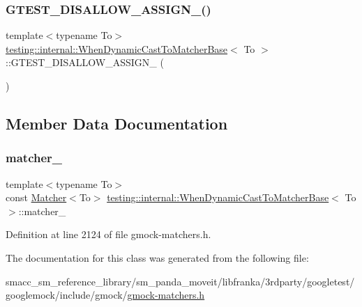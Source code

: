 \subsubsection{\texorpdfstring{G\+T\+E\+S\+T\+\_\+\+D\+I\+S\+A\+L\+L\+O\+W\+\_\+\+A\+S\+S\+I\+G\+N\+\_\+()}{GTEST\_DISALLOW\_ASSIGN\_()}}
{\footnotesize\ttfamily template$<$typename To$>$ \\
\hyperlink{classtesting_1_1internal_1_1WhenDynamicCastToMatcherBase}{testing\+::internal\+::\+When\+Dynamic\+Cast\+To\+Matcher\+Base}$<$ To $>$\+::G\+T\+E\+S\+T\+\_\+\+D\+I\+S\+A\+L\+L\+O\+W\+\_\+\+A\+S\+S\+I\+G\+N\+\_\+ (\begin{DoxyParamCaption}\item[{\hyperlink{classtesting_1_1internal_1_1WhenDynamicCastToMatcherBase}{When\+Dynamic\+Cast\+To\+Matcher\+Base}$<$ To $>$}]{ }\end{DoxyParamCaption})\hspace{0.3cm}{\ttfamily [private]}}



\subsection{Member Data Documentation}
\mbox{\label{classtesting_1_1internal_1_1WhenDynamicCastToMatcherBase_a40d697407c960bee8fe3b125f5ac8730}} 
\subsubsection{\texorpdfstring{matcher\+\_\+}{matcher\_}}
{\footnotesize\ttfamily template$<$typename To$>$ \\
const \hyperlink{classtesting_1_1Matcher}{Matcher}$<$To$>$ \hyperlink{classtesting_1_1internal_1_1WhenDynamicCastToMatcherBase}{testing\+::internal\+::\+When\+Dynamic\+Cast\+To\+Matcher\+Base}$<$ To $>$\+::matcher\+\_\+\hspace{0.3cm}{\ttfamily [protected]}}



Definition at line 2124 of file gmock-\/matchers.\+h.



The documentation for this class was generated from the following file\+:\begin{DoxyCompactItemize}
\item 
smacc\+\_\+sm\+\_\+reference\+\_\+library/sm\+\_\+panda\+\_\+moveit/libfranka/3rdparty/googletest/googlemock/include/gmock/\hyperlink{gmock-matchers_8h}{gmock-\/matchers.\+h}\end{DoxyCompactItemize}
